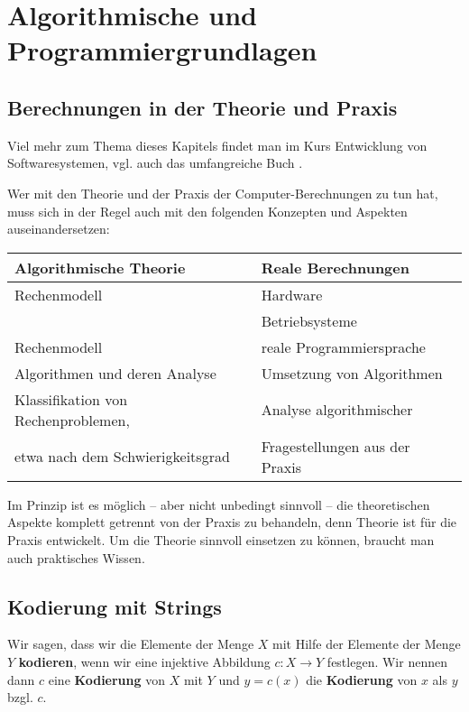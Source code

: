 \chapter{Algorithmische und Programmiergrundlagen}

\section{Berechnungen in der Theorie und Praxis} 

\begin{bem} 
Viel mehr zum Thema dieses Kapitels findet man im Kurs Entwicklung von Softwaresystemen, vgl. auch das umfangreiche Buch \cite{GS11}. 
\end{bem} 

\begin{bem} Wer mit den Theorie und der Praxis der  Computer-Berechnungen zu tun hat, muss sich in der Regel auch mit den folgenden Konzepten und Aspekten auseinandersetzen: 
	\begin{center} 
			\begin{tabular}{l|l} 
				Algorithmische Theorie& Reale Berechnungen 
				\\ \hline\hline 
				Rechenmodell  & Hardware 
				\\  & Betriebsysteme 
				\\  Rechenmodell & reale Programmiersprache 
				\\ \hline Algorithmen und deren Analyse & Umsetzung von Algorithmen
				\\ \hline Klassifikation von Rechenproblemen, & Analyse algorithmischer 
				\\ etwa nach dem Schwierigkeitsgrad  & Fragestellungen aus der Praxis 
			\end{tabular} 
	\end{center} 
	Im Prinzip ist es möglich -- aber nicht unbedingt sinnvoll -- die theoretischen Aspekte komplett getrennt von der Praxis zu behandeln, denn Theorie ist für die Praxis entwickelt. Um die Theorie sinnvoll einsetzen zu können, braucht man auch praktisches Wissen. 
\end{bem} 

\section{Kodierung mit Strings} 

\begin{defn}
Wir sagen, dass wir die Elemente der  Menge $X$ mit Hilfe der Elemente der Menge $Y$ \textbf{kodieren}, wenn wir eine  injektive Abbildung $c : X \to Y$ festlegen. Wir nennen dann $c$ eine \textbf{Kodierung} von $X$ mit $Y$ und $y=c(x)$ die \textbf{Kodierung} von $x$ als $y$ bzgl. $c$.  
\end{defn}

